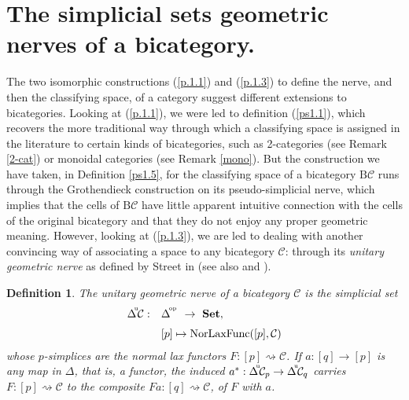 \documentclass[]{amsart}
\newtheorem{definition}[theorem]{Definition}
\begin{document}
\section{The simplicial sets geometric nerves of a bicategory.}
The two isomorphic constructions (\ref{p.1.1}) and (\ref{p.1.3}) to define the nerve, and then the
classifying space, of a category suggest different extensions to bicategories. Looking at
(\ref{p.1.1}), we were led to definition (\ref{ps1.1}), which recovers the more traditional way
through which a classifying space is assigned in the literature to certain kinds of bicategories,
such as 2-categories (see Remark \ref{2-cat}) or monoidal categories (see Remark \ref{mono}). But
the construction we have taken, in Definition  \ref{ps1.5}, for the classifying space of a
bicategory ${\ensuremath{\mathrm{B}}} {\ensuremath{\mathcal{C}}}$ runs through the Grothendieck construction on its pseudo-simplicial nerve,
which implies that the cells of ${\ensuremath{\mathrm{B}}}{\ensuremath{\mathcal{C}}}$ have little apparent intuitive connection with the cells
of the original bicategory and that they do not enjoy any proper geometric meaning. However,
looking at (\ref{p.1.3}), we are led to dealing with another convincing way of associating a space
to any bicategory ${\ensuremath{\mathcal{C}}}$: through its {\em unitary geometric nerve}  as defined by Street in
\cite{street} (see also \cite{duskin} and \cite{gurski2}).
\begin{definition} The unitary geometric nerve of a bicategory ${\ensuremath{\mathcal{C}}}$ is the simplicial set
\begin{equation}\label{ngn} \begin{array}{ll}\Delta^{\hspace{-2pt}^\mathrm{u}}\!{\ensuremath{\mathcal{C}}}:&\Delta^{\!^{\mathrm{op}}}\ \to \ {\ensuremath{\mathbf{Set}}},\\[6pt]
&[p]\mapsto \mathrm{NorLaxFunc}([p],{\ensuremath{\mathcal{C}}})\end{array}\end{equation} whose $p$-simplices are the normal
lax functors ${F:[p]\rightsquigarrow {\ensuremath{\mathcal{C}}}}$. If $a:[q]\to [p]$ is any map in $\Delta$, that is, a
functor,  the induced
$a^*:\Delta^{\hspace{-2pt}^\mathrm{u}}\!{\ensuremath{\mathcal{C}}}_p\to\Delta^{\hspace{-2pt}^\mathrm{u}}\!{\ensuremath{\mathcal{C}}}_q$ carries
${F:[p]\rightsquigarrow {\ensuremath{\mathcal{C}}}}$ to the composite ${Fa:[q]\rightsquigarrow {\ensuremath{\mathcal{C}}}}$, of $F$ with $a$.
\end{definition}
\end{document}
